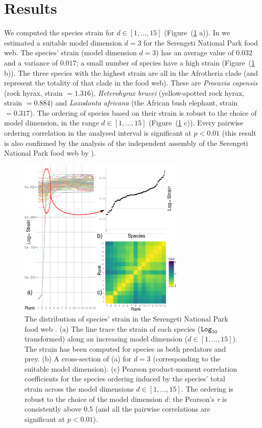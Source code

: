 \documentclass[]{rsos}%
\begin{document}
\section{Results}

We computed the species strain for $d \in \left[ 1, \dots,  15 \right]$ (Figure~(\ref{fig:strain_1}
a)). In \citep{dallariva2015exploring} we estimated a suitable model dimension $d = 3$
for the Serengeti National Park food web.  The species'
strain (model dimension $d = 3$) has an average value of $0.032$ and a variance of $0.017$;
a small number of species have a high strain (Figure~(\ref{fig:strain_1} b)). The
three species with the highest strain are all in the Afrotheria clade (and represent
the totality of that clade in the food web). These are \emph{Procavia
capensis} (rock hyrax, strain $= 1.316$), \emph{Heterohyrax
brucei} (yellow-spotted rock hyrax, strain $= 0.884$) and
\emph{Loxodonta africana} (the African bush elephant, strain
$= 0.317$). The ordering of species based on their strain is robust to the
choice of model dimension, in the range $d \in \left[ 1, \dots,  15 \right]$
(Figure~(\ref{fig:strain_1} c)). Every pairwise ordering correlation in the analysed
interval is significant at $p < 0.01$ (this result is also confirmed
by the analysis of the independent assembly of the Serengeti National Park food
web by \cite{de2011serengeti}).

\begin{figure}[hbt]
 \centering
 \includegraphics[width=0.7\textwidth]{./images/chap_2/Figure_1.pdf}
 \caption{The distribution of species' strain in the Serengeti National Park food web
\citep{baskerville2011spatial}.
(a) The line trace the strain of each species ($\mbox{\texttt{Log}}_{10}$ transformed) along
an increasing model dimension ($d \in \left[ 1, \dots , 15\right]$). The strain
has been computed for species as both predators and prey.
(b) A cross-section of (a) for $d  = 3$ (corresponding to the suitable model dimension).
(c) Pearson product-moment correlation coefficients for the species ordering induced by the
species' total strain across the model dimensions $d \in \left[ 1, \dots , 15\right]$.
The ordering is robust to the choice of the model dimension $d$: the Pearson's \textit{r} is consistently
above 0.5 (and all the pairwise correlations are significant at $p < 0.01$).}\label{fig:strain_1}
\end{figure}
\end{document}
